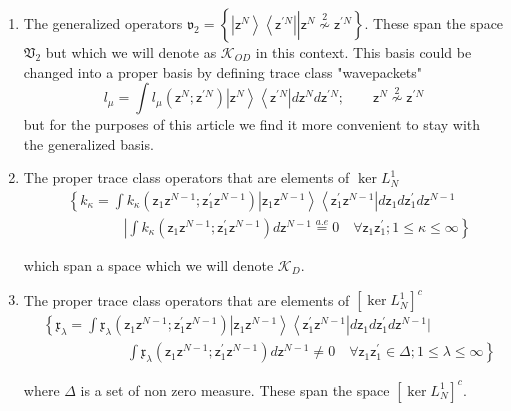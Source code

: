 \documentclass[aps,preprint]{revtex4}%
\begin{document}
\begin{enumerate}
\item The generalized operators $\mathfrak{v}_{2}=\left\{  \left\vert
\mathsf{z}^{N}\right\rangle \left\langle \mathsf{z}^{\prime N}\right\vert
\left\vert \mathsf{z}^{N}\overset{2}{\nsim}\mathsf{z}^{\prime N}\right.
\right\}  $. These span the space $\mathfrak{V}_{2}$ but which we will denote
as $\mathcal{K}_{OD}$ in this context. This basis could be changed into a
proper basis by defining trace class "wavepackets"
\[
l_{\mu}=%
{\displaystyle\int}
l_{\mu}\left(  \mathsf{z}^{N};\mathsf{z}^{\prime N}\right)  \left\vert
\mathsf{z}^{N}\right\rangle \left\langle \mathsf{z}^{\prime N}\right\vert
d\mathsf{z}^{N}d\mathsf{z}^{\prime N};\qquad\mathsf{z}^{N}\overset{2}{\nsim
}\mathsf{z}^{\prime N}%
\]
but for the purposes of this article we find it more convenient to stay with
the generalized basis.

\item The proper trace class operators that are elements of $\ker L_{N}^{1}$
\begin{align*}
&  \left\{  k_{\kappa}=%
{\displaystyle\int}
k_{\kappa}\left(  \mathsf{z}_{1}\mathsf{z}^{N-1};\mathsf{z}_{1}^{\prime
}\mathsf{z}^{N-1}\right)  \left\vert \mathsf{z}_{1}\mathsf{z}^{N-1}%
\right\rangle \left\langle \mathsf{z}_{1}^{\prime}\mathsf{z}^{N-1}\right\vert
d\mathsf{z}_{1}d\mathsf{z}_{1}^{\prime}d\mathsf{z}^{N-1}\right. \\
&  \qquad\qquad\left.  \left\vert
{\displaystyle\int}
k_{\kappa}\left(  \mathsf{z}_{1}\mathsf{z}^{N-1};\mathsf{z}_{1}^{\prime
}\mathsf{z}^{N-1}\right)  d\mathsf{z}^{N-1}\right.  \overset{a.e}{=}%
0\quad\forall\mathsf{z}_{1}\mathsf{z}_{1}^{\prime};1\leq\kappa\leq
\infty\overset{}{}\right\}
\end{align*}


which span a space which we will denote $\mathcal{K}_{D}$.

\item The proper trace class operators that are elements of $\left[  \ker
L_{N}^{1}\right]  ^{c}$%
\begin{align*}
&  \left\{  \mathfrak{x}_{\lambda}=%
{\displaystyle\int}
\mathfrak{x}_{\lambda}\left(  \mathsf{z}_{1}\mathsf{z}^{N-1};\mathsf{z}%
_{1}^{\prime}\mathsf{z}^{N-1}\right)  \left\vert \mathsf{z}_{1}\mathsf{z}%
^{N-1}\right\rangle \left\langle \mathsf{z}_{1}^{\prime}\mathsf{z}%
^{N-1}\right\vert d\mathsf{z}_{1}d\mathsf{z}_{1}^{\prime}d\mathsf{z}%
^{N-1}|\right. \\
&  \qquad\qquad\qquad\left.  \int\mathfrak{x}_{\lambda}\left(  \mathsf{z}%
_{1}\mathsf{z}^{N-1};\mathsf{z}_{1}^{\prime}\mathsf{z}^{N-1}\right)
d\mathsf{z}^{N-1}\neq0\quad\forall\mathsf{z}_{1}\mathsf{z}_{1}^{\prime}%
\in\Delta;1\leq\lambda\leq\infty\overset{}{}\right\}
\end{align*}


where $\Delta$ is a set of non zero measure. These span the space $\left[
\ker L_{N}^{1}\right]  ^{c}$.
\end{enumerate}
\end{document}
